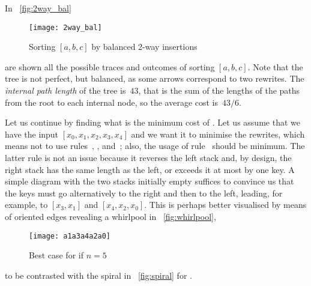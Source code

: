 In \fig~\vref{fig:2way_bal}
\begin{figure}
\centering
\texttt{[image: 2way\_bal]}
\caption{Sorting \([a,b,c]\) by balanced 2-way insertions}
\label{fig:2way_bal}
\end{figure}
are shown all the possible traces and
outcomes of sorting \([a,b,c]\). Note that the tree is not
perfect, but balanced, as some arrows
correspond to two rewrites. The \emph{internal path
  length}\label{insertion__internal_path_length}
 of the tree is~\(43\), that
is the sum of the lengths of the paths from the root to each internal
node, so the average cost is~\(43/6\).


Let us continue by finding what is the minimum cost of
. Let us assume that we have the input \([x_0, x_1, x_2,
x_3, x_4]\) and we want it to minimise the rewrites, which means not
to use rules~\clause{\sigma}, \clause{\tau}, \clause{\phi}
and~\clause{\chi}; also, the usage of rule~\clause{\rho} should be
minimum. The latter rule is not an issue because it reverses the left
stack and, by design, the right stack has the same length as the left,
or exceeds it at most by one key. A simple diagram with the two stacks
initially empty suffices to convince us that the keys must go
alternatively to the right and then to the left, leading, for example,
to \([x_3 , x_1]\) and \([x_4, x_2, x_0]\). This is perhaps better
visualised by means of oriented edges revealing a whirlpool in
\fig~\vref{fig:whirlpool},
\begin{figure}[b]
\centering
\texttt{[image: a1a3a4a2a0]}
\caption{Best case for  if \(n=5\)}
\label{fig:whirlpool}
\end{figure}
to be contrasted with the spiral in \fig~\vref{fig:spiral} for
.

